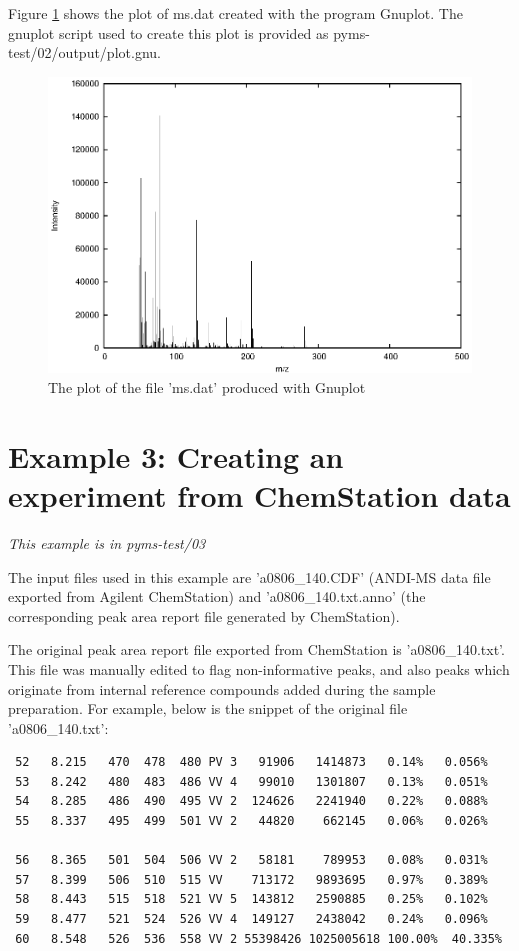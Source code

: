 Figure \ref{mass-spectrum} shows the plot of ms.dat created with the
program Gnuplot. The gnuplot script used to create this plot is
provided as pyms-test/02/output/plot.gnu.

\begin{figure}[htp]
\begin{center}
\includegraphics{graphics/ms.eps}
\caption{The plot of the file 'ms.dat' produced with Gnuplot}
\label{mass-spectrum}
\end{center}
\end{figure}

\section{Example 3: Creating an experiment from ChemStation data}

\noindent
{\em This example is in pyms-test/03}

The input files used in this example are 'a0806\_140.CDF' (ANDI-MS data
file exported from Agilent ChemStation) and 'a0806\_140.txt.anno' (the 
corresponding peak area report file generated by ChemStation).

The original peak area report file exported from ChemStation is
'a0806\_140.txt'. This file was manually edited to flag non-informative
peaks, and also peaks which originate from internal reference compounds
added during the sample preparation. For example, below is the snippet
of the original file 'a0806\_140.txt':

\begin{verbatim}
 52   8.215   470  478  480 PV 3   91906   1414873   0.14%   0.056%
 53   8.242   480  483  486 VV 4   99010   1301807   0.13%   0.051%
 54   8.285   486  490  495 VV 2  124626   2241940   0.22%   0.088%
 55   8.337   495  499  501 VV 2   44820    662145   0.06%   0.026%
 
 56   8.365   501  504  506 VV 2   58181    789953   0.08%   0.031%
 57   8.399   506  510  515 VV    713172   9893695   0.97%   0.389%
 58   8.443   515  518  521 VV 5  143812   2590885   0.25%   0.102%
 59   8.477   521  524  526 VV 4  149127   2438042   0.24%   0.096%
 60   8.548   526  536  558 VV 2 55398426 1025005618 100.00%  40.335%
\end{verbatim}

